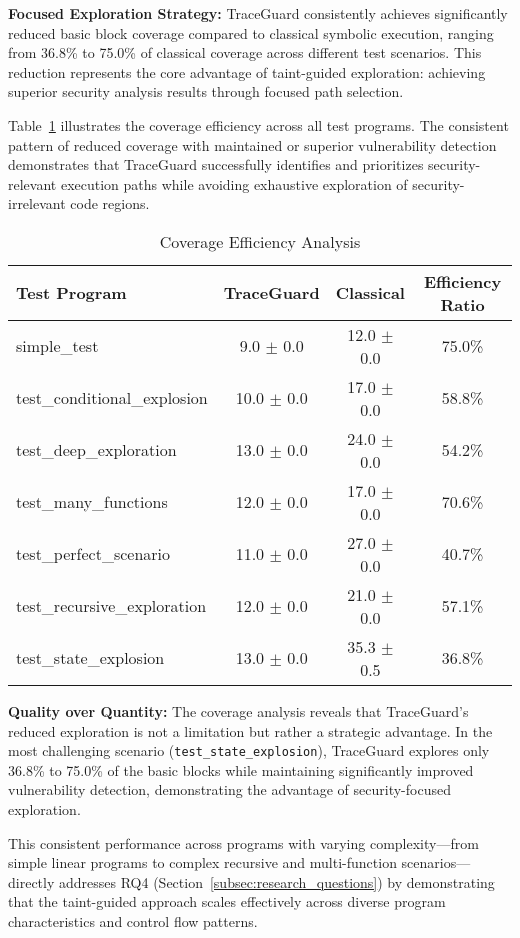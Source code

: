 \textbf{Focused Exploration Strategy:} TraceGuard consistently achieves significantly reduced basic block coverage compared to classical symbolic execution, ranging from 36.8\% to 75.0\% of classical coverage across different test scenarios. This reduction represents the core advantage of taint-guided exploration: achieving superior security analysis results through focused path selection.

Table~\ref{tab:coverage_efficiency} illustrates the coverage efficiency across all test programs. The consistent pattern of reduced coverage with maintained or superior vulnerability detection demonstrates that TraceGuard successfully identifies and prioritizes security-relevant execution paths while avoiding exhaustive exploration of security-irrelevant code regions.

\begin{table}[htbp]
\centering
\caption{Coverage Efficiency Analysis}
\label{tab:coverage_efficiency}
\begin{tabular}{lccc}
\toprule
\textbf{Test Program} & \textbf{TraceGuard} & \textbf{Classical} & \textbf{Efficiency Ratio} \\
\midrule
simple\_test & 9.0 $\pm$ 0.0 & 12.0 $\pm$ 0.0 & 75.0\% \\
test\_conditional\_explosion & 10.0 $\pm$ 0.0 & 17.0 $\pm$ 0.0 & 58.8\% \\
test\_deep\_exploration & 13.0 $\pm$ 0.0 & 24.0 $\pm$ 0.0 & 54.2\% \\
test\_many\_functions & 12.0 $\pm$ 0.0 & 17.0 $\pm$ 0.0 & 70.6\% \\
test\_perfect\_scenario & 11.0 $\pm$ 0.0 & 27.0 $\pm$ 0.0 & 40.7\% \\
test\_recursive\_exploration & 12.0 $\pm$ 0.0 & 21.0 $\pm$ 0.0 & 57.1\% \\
test\_state\_explosion & 13.0 $\pm$ 0.0 & 35.3 $\pm$ 0.5 & 36.8\% \\
\bottomrule
\end{tabular}
\end{table}

\textbf{Quality over Quantity:} The coverage analysis reveals that TraceGuard's reduced exploration is not a limitation but rather a strategic advantage. In the most challenging scenario (\texttt{test\_state\_explosion}), TraceGuard explores only 36.8\% to 75.0\% of the basic blocks while maintaining significantly improved vulnerability detection, demonstrating the advantage of security-focused exploration.

This consistent performance across programs with varying complexity---from simple linear programs to complex recursive and multi-function scenarios---directly addresses RQ4 (Section~\ref{subsec:research_questions}) by demonstrating that the taint-guided approach scales effectively across diverse program characteristics and control flow patterns.

